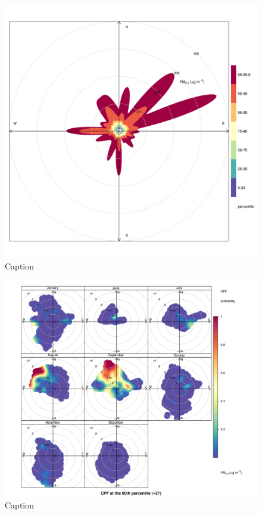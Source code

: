 \documentclass{nwureport}
\begin{document}
\begin{figure}[!htb]
    \centering
    \includegraphics[width=\textwidth]{images/Wedela_PM2-5_percentileRose.png}
    \caption{Caption}
    \label{fig:summary}
\end{figure}

\begin{figure}[!htb]
    \centering
    \includegraphics[width=\textwidth]{images/Wedela_PM2-5_polar.png}
    \caption{Caption}
    \label{fig:summary}
\end{figure}
\end{document}
